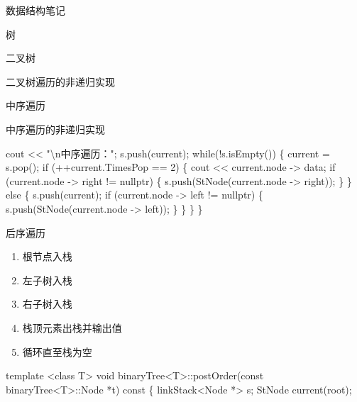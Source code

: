 \documentclass[
  ignorenonframetext,
]{beamer}
\newenvironment{Shaded}{}{}
\newcommand{\NormalTok}[1]{#1}
\providecommand{\tightlist}{%
  \setlength{\itemsep}{0pt}\setlength{\parskip}{0pt}}
\begin{document}
\begin{frame}[fragile]{数据结构笔记}
\begin{block}{树}
\begin{block}{二叉树}
\begin{block}{二叉树遍历的非递归实现}
\begin{block}{中序遍历}
\begin{block}{中序遍历的非递归实现}
\begin{Shaded}
\begin{Highlighting}[]
\NormalTok{  cout \textless{}\textless{} "\textbackslash{}n中序遍历：";}
\NormalTok{  s.push(current);}
\NormalTok{  while(!s.isEmpty())}
\NormalTok{  \{}
\NormalTok{    current = s.pop();}
\NormalTok{    if (++current.TimesPop == 2)}
\NormalTok{    \{}
\NormalTok{      cout \textless{}\textless{} current.node {-}\textgreater{} data;}
\NormalTok{      if (current.node {-}\textgreater{} right != nullptr)}
\NormalTok{      \{}
\NormalTok{        s.push(StNode(current.node {-}\textgreater{} right));}
\NormalTok{      \}}
\NormalTok{    \}}
\NormalTok{    else}
\NormalTok{    \{}
\NormalTok{      s.push(current);}
\NormalTok{      if (current.node {-}\textgreater{} left != nullptr)}
\NormalTok{      \{}
\NormalTok{        s.push(StNode(current.node {-}\textgreater{} left));}
\NormalTok{      \}}
\NormalTok{    \}}
\NormalTok{  \}}
\NormalTok{\}}
\end{Highlighting}
\end{Shaded}
\end{block}
\end{block}

\begin{block}{后序遍历}
\protect{}\label{ux540eux5e8fux904dux5386-2}
\begin{enumerate}
\tightlist
\item
  根节点入栈
\item
  左子树入栈
\item
  右子树入栈
\item
  栈顶元素出栈并输出值
\item
  循环直至栈为空
\end{enumerate}

\begin{Shaded}
\begin{Highlighting}[]
\NormalTok{template \textless{}class T\textgreater{}}
\NormalTok{void binaryTree\textless{}T\textgreater{}::postOrder(const binaryTree\textless{}T\textgreater{}::Node *t) const}
\NormalTok{\{}
\NormalTok{  linkStack\textless{}Node *\textgreater{} s;}
\NormalTok{  StNode current(root);}


\end{Highlighting}
\end{Shaded}
\end{block}
\end{block}
\end{block}
\end{block}
\end{frame}
\end{document}
